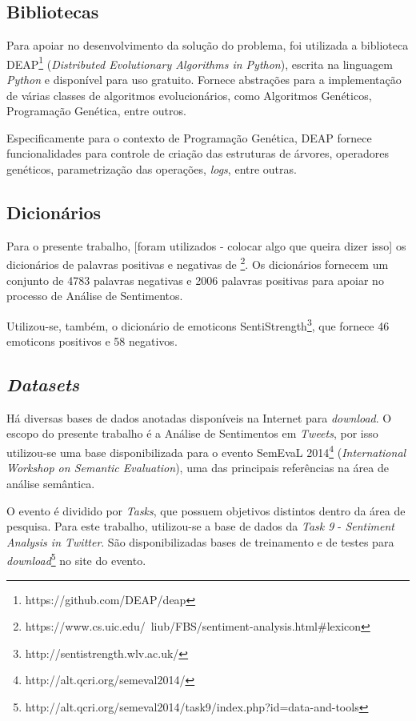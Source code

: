 \documentclass[12pt]{article}
\begin{document}
\subsection{Bibliotecas}

Para apoiar no desenvolvimento da solução do problema, foi utilizada a biblioteca DEAP\footnote{https://github.com/DEAP/deap} (\emph{Distributed Evolutionary Algorithms in Python}), escrita na linguagem \emph{Python} e disponível para uso gratuito. Fornece abstrações para a implementação de várias classes de algoritmos evolucionários, como Algoritmos Genéticos, Programação Genética, entre outros. \cite{DEAP_JMLR2012}

Especificamente para o contexto de Programação Genética, DEAP fornece funcionalidades para controle de criação das estruturas de árvores, operadores genéticos, parametrização das operações, \emph{logs}, entre outras.

\subsection{Dicionários}

Para o presente trabalho, [foram utilizados - colocar algo que queira dizer isso] os dicionários de palavras positivas e negativas de \cite{HuAndLiu2004}\footnote{https://www.cs.uic.edu/~liub/FBS/sentiment-analysis.html\#lexicon}. Os dicionários fornecem um conjunto de 4783 palavras negativas e 2006 palavras positivas para apoiar no processo de Análise de Sentimentos.

Utilizou-se, também, o dicionário de emoticons SentiStrength\footnote{http://sentistrength.wlv.ac.uk/}, que fornece 46 emoticons positivos e 58 negativos.

\subsection{\emph{Datasets}}
\label{datasets}
Há diversas bases de dados anotadas disponíveis na Internet para \emph{download}. O escopo do presente trabalho é a Análise de Sentimentos em \emph{Tweets}, por isso utilizou-se uma base disponibilizada para o evento SemEvaL 2014\footnote{http://alt.qcri.org/semeval2014/} (\emph{International Workshop on Semantic Evaluation}), uma das principais referências na área de análise semântica.  

O evento é dividido por \emph{Tasks}, que possuem objetivos distintos dentro da área de pesquisa. Para este trabalho, utilizou-se a base de dados da \emph{Task 9} - \emph{Sentiment Analysis in Twitter}. São disponibilizadas bases de treinamento e de testes para \emph{download}\footnote{http://alt.qcri.org/semeval2014/task9/index.php?id=data-and-tools} no site do evento.
\end{document}
